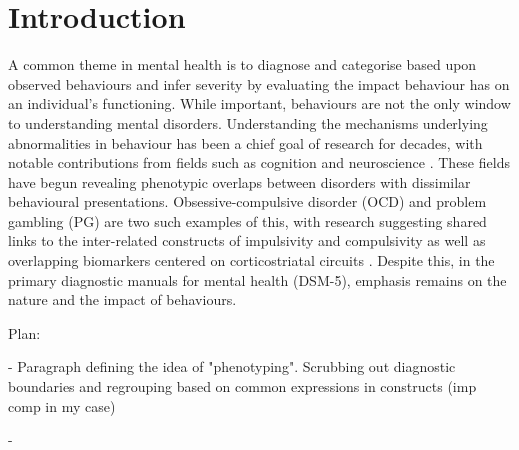 \section{Introduction}

A common theme in mental health is to diagnose and categorise based upon observed behaviours and infer severity by evaluating the impact behaviour has on an individual's functioning. While important, behaviours are not the only window to understanding mental disorders. Understanding the mechanisms underlying abnormalities in behaviour has been a chief goal of research for decades, with notable contributions from fields such as cognition and neuroscience \cite{Frank_2015}. These fields have begun revealing phenotypic overlaps between disorders with dissimilar behavioural presentations. Obsessive-compulsive disorder (OCD) and problem gambling (PG) are two such examples of this, with research suggesting shared links to the inter-related constructs of impulsivity and compulsivity \cite{Tavares_2007} as well as overlapping biomarkers centered on corticostriatal circuits \cite{van_Holst_2010,Harrison_2009,Harrison_2013}. Despite this, in the primary diagnostic manuals for mental health (DSM-5), emphasis remains on the nature and the impact of behaviours.

Plan:

- Paragraph defining the idea of "phenotyping". Scrubbing out diagnostic boundaries and regrouping based on common expressions in constructs (imp comp in my case)

- 



